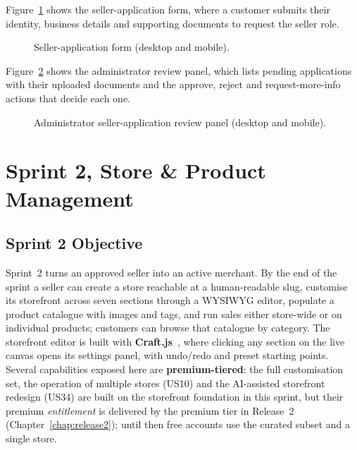 Figure~\ref{fig:real-apply} shows the seller-application form, where a
customer submits their identity, business details and supporting documents
to request the seller role.

\begin{figure}[H]
  \centering
  \caption{Seller-application form (desktop and mobile).}
  \label{fig:real-apply}
\end{figure}

Figure~\ref{fig:real-review} shows the administrator review panel, which
lists pending applications with their uploaded documents and the approve,
reject and request-more-info actions that decide each one.

\begin{figure}[H]
  \centering
  \caption{Administrator seller-application review panel (desktop and mobile).}
  \label{fig:real-review}
\end{figure}

\section{Sprint 2, Store \& Product Management}

\subsection{Sprint 2 Objective}

Sprint~2 turns an approved seller into an active merchant. By the end of
the sprint a seller can create a store reachable at a human-readable
slug, customise its storefront across seven sections through a WYSIWYG
editor, populate a product catalogue with images and tags, and run
sales either store-wide or on individual products; customers can browse
that catalogue by category. The
storefront editor is built with \textbf{Craft.js}~\cite{craftjs}, where clicking any
section on the live canvas opens its settings panel, with undo/redo and
preset starting points. Several capabilities exposed here are
\textbf{premium-tiered}: the full customisation set, the operation of
multiple stores (US10) and the AI-assisted storefront redesign (US34) are
built on the storefront foundation in this sprint, but their premium
\emph{entitlement} is delivered by the premium tier in Release~2
(Chapter~\ref{chap:release2}); until then free accounts use the curated
subset and a single store.

